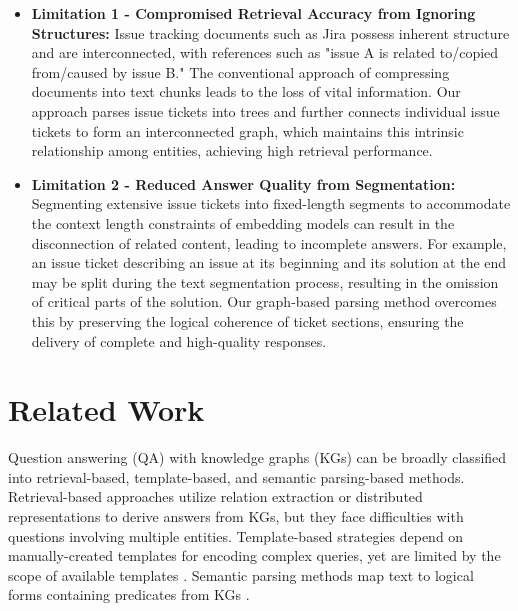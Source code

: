 \documentclass[sigconf]{acmart}
\begin{document}
\begin{itemize}
    \item \textbf{Limitation 1 - Compromised Retrieval Accuracy from Ignoring Structures:} Issue tracking documents such as Jira \cite{AtlassianJira} possess inherent structure and are interconnected, with references such as "issue A is related to/copied from/caused by issue B." The conventional approach of compressing documents into text chunks leads to the loss of vital information. Our approach parses issue tickets into trees and further connects individual issue tickets to form an interconnected graph, which maintains this intrinsic relationship among entities, achieving high retrieval performance.
    \item \textbf{Limitation 2 - Reduced Answer Quality from Segmentation:} Segmenting extensive issue tickets into fixed-length segments to accommodate the context length constraints of embedding models can result in the disconnection of related content, leading to incomplete answers. For example, an issue ticket describing an issue at its beginning and its solution at the end may be split during the text segmentation process, resulting in the omission of critical parts of the solution. Our graph-based parsing method overcomes this by preserving the logical coherence of ticket sections, ensuring the delivery of complete and high-quality responses.
\end{itemize}

\section{Related Work}

Question answering (QA) with knowledge graphs (KGs) can be broadly classified into retrieval-based, template-based, and semantic parsing-based methods. Retrieval-based approaches utilize relation extraction \cite{xu2016hybrid} or distributed representations \cite{bordes2014open} to derive answers from KGs, but they face difficulties with questions involving multiple entities. Template-based strategies depend on manually-created templates for encoding complex queries, yet are limited by the scope of available templates \cite{unger2012template}. Semantic parsing methods map text to logical forms containing predicates from KGs \cite{bhutani2020answering}  \cite{sun-etal-2018-open} \cite{yih2015semantic}.
\end{document}
